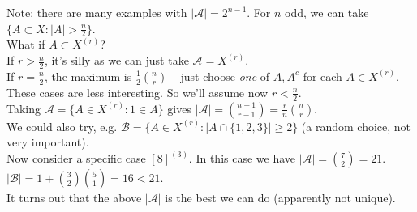 \documentclass[a4paper]{article}
\begin{document}
Note: there are many examples with $|\mathcal{A}| = 2^{n-1}$. For $n$ odd, we can take $\{A \subset X: |A| > \frac{n}{2}\}$.\\
What if $A \subset X^{(r)}$?\\
If $r > \frac{n}{2}$, it's silly as we can just take $\mathcal{A} = X^{(r)}$.\\
If $r = \frac{n}{2}$, the maximum is $\frac{1}{2} {n \choose r}$ -- just choose \emph{one} of $A,A^c$ for each $A \in X^{(r)}$.\\
These cases are less interesting. So we'll assume now $r<\frac{n}{2}$.\\
Taking $\mathcal{A} = \{A \in X^{(r)} : 1 \in A\}$ gives $|\mathcal{A}| = {{n-1} \choose {r-1}} =\frac{r}{n} {n \choose r}$.\\
We could also try, e.g. $\mathcal{B} = \{A \in X^{(r)}: |A \cap \{1,2,3\} | \geq 2\}$ (a random choice, not very important).\\
Now consider a specific case $[8]^{(3)}$. In this case we have $|\mathcal{A}| = {7 \choose 2} = 21$. $|\mathcal{B}| = 1+{3 \choose 2} {5 \choose 1} = 16 < 21$.\\
It turns out that the above $|\mathcal{A}|$ is the best we can do (apparently not unique).
\end{document}
